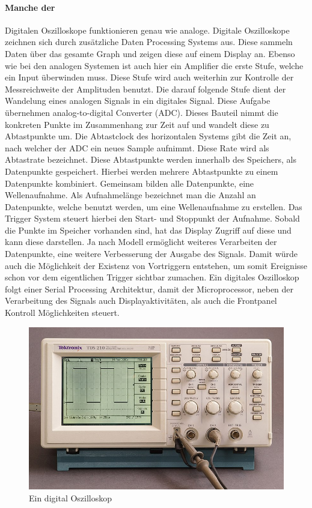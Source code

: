 \documentclass{article}
\begin{document}
\paragraph{Manche der}
Digitalen Oszilloskope funktionieren genau wie analoge. Digitale Oszilloskope zeichnen sich durch zusätzliche Daten Processing Systems aus. Diese sammeln Daten über das gesamte Graph und zeigen diese auf einem Display an. Ebenso wie bei den analogen Systemen ist auch hier ein Amplifier die erste Stufe, welche ein Input überwinden muss. Diese Stufe wird auch weiterhin zur Kontrolle der Messreichweite der Amplituden benutzt. Die darauf folgende Stufe dient der Wandelung eines analogen Signals in ein digitales Signal. Diese Aufgabe übernehmen analog-to-digital Converter (ADC). Dieses Bauteil nimmt die konkreten Punkte im Zusammenhang zur Zeit auf und wandelt diese zu Abtastpunkte um. Die Abtastclock des horizontalen Systems gibt die Zeit an, nach welcher der ADC ein neues Sample aufnimmt. Diese Rate wird als Abtastrate bezeichnet. Diese Abtastpunkte werden innerhalb des Speichers, als Datenpunkte gespeichert. Hierbei werden mehrere Abtastpunkte zu einem Datenpunkte kombiniert. Gemeinsam bilden alle Datenpunkte, eine Wellenaufnahme. Als Aufnahmelänge bezeichnet man die Anzahl an Datenpunkte, welche benutzt werden, um eine Wellenaufnahme zu erstellen. Das Trigger System steuert hierbei den Start- und Stoppunkt der Aufnahme. Sobald die Punkte im Speicher vorhanden sind, hat das Display Zugriff auf diese und kann diese darstellen.
Ja nach Modell ermöglicht weiteres Verarbeiten der Datenpunkte, eine weitere Verbesserung der Ausgabe des Signals. Damit würde auch die Möglichkeit der Existenz von Vortriggern entstehen, um somit Ereignisse schon vor dem eigentlichen Trigger sichtbar zumachen. Ein digitales Oszilloskop folgt einer Serial Processing Architektur, damit der Microprocessor, neben der Verarbeitung des Signals auch Displayaktivitäten, als auch die Frontpanel Kontroll Möglichkeiten steuert.\cite{mcclurel}
\begin{figure}[H]
  \includegraphics[width=\textwidth]{"Digitaloszilloskop_IMGP1971_WP"}
  \caption[\textbf{DigitaloszilloskopIMGP1971WP.jpg},  Quelle:https://en.wikipedia.org/wiki/Digital-storage-oscilloscope (zuletzt abgerufen: 04.09.2021)]{Ein digital Oszilloskop}
\end{figure}
\newline
\end{document}
